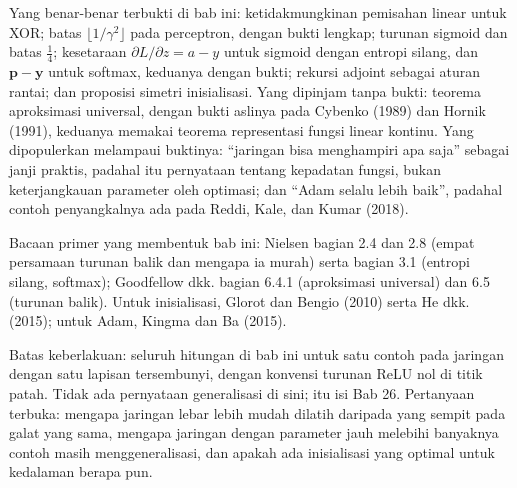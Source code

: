 \begin{untukpeneliti}
Yang benar-benar terbukti di bab ini: ketidakmungkinan pemisahan linear untuk XOR; batas
$\lfloor1/\gamma^{2}\rfloor$ pada perceptron, dengan bukti lengkap; turunan sigmoid dan
batas $\tfrac14$; kesetaraan $\partial L/\partial z=a-y$ untuk sigmoid dengan entropi silang,
dan $\mathbf{p}-\mathbf{y}$ untuk softmax, keduanya dengan bukti; rekursi adjoint sebagai
aturan rantai; dan proposisi simetri inisialisasi. Yang dipinjam tanpa bukti: teorema
aproksimasi universal, dengan bukti aslinya pada Cybenko (1989) dan Hornik (1991), keduanya
memakai teorema representasi fungsi linear kontinu. Yang dipopulerkan melampaui buktinya:
``jaringan bisa menghampiri apa saja'' sebagai janji praktis, padahal itu pernyataan tentang kepadatan fungsi, bukan keterjangkauan parameter oleh optimasi; dan ``Adam selalu lebih baik'', padahal contoh penyangkalnya ada pada Reddi, Kale, dan Kumar (2018).

Bacaan primer yang membentuk bab ini: Nielsen bagian 2.4 dan 2.8 (empat persamaan turunan balik dan mengapa ia murah) serta bagian 3.1 (entropi silang, softmax); Goodfellow dkk. bagian 6.4.1 (aproksimasi universal) dan 6.5 (turunan balik). Untuk inisialisasi, Glorot dan Bengio (2010) serta He dkk. (2015); untuk Adam, Kingma dan Ba (2015).

Batas keberlakuan: seluruh hitungan di bab ini untuk satu contoh pada jaringan dengan satu lapisan tersembunyi, dengan konvensi turunan ReLU nol di titik patah. Tidak ada pernyataan generalisasi di sini; itu isi Bab 26. Pertanyaan terbuka: mengapa jaringan lebar lebih mudah dilatih daripada yang sempit pada galat yang sama, mengapa jaringan dengan parameter jauh melebihi banyaknya contoh masih menggeneralisasi, dan apakah ada inisialisasi yang optimal untuk kedalaman berapa pun.
\end{untukpeneliti}

